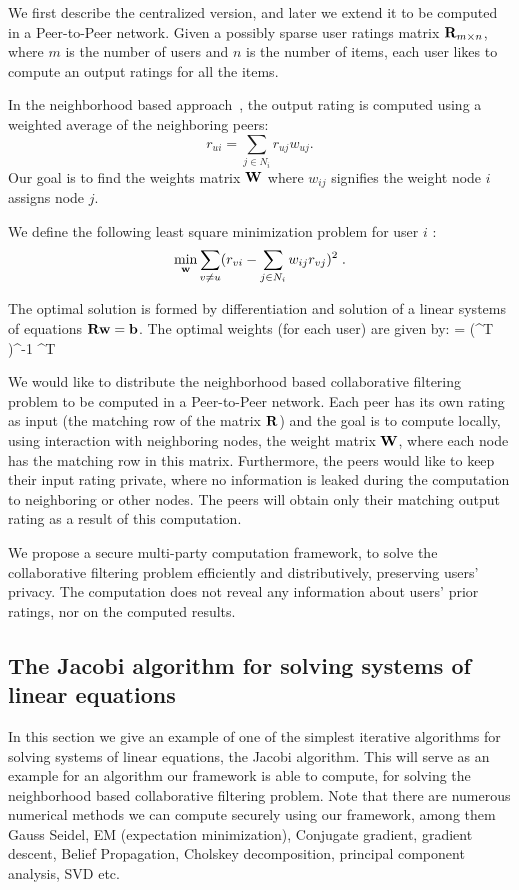 \documentclass[times, 10pt,twocolumn]{article}
\begin{document}
We first describe the centralized version, and later we extend it
to be computed in a Peer-to-Peer network. Given a possibly sparse
user ratings matrix ${\bf R}_{m \times n}$, where $m$ is the number of
users and $n$ is the number of items, each user likes to compute
an output ratings for all the items.

In the neighborhood based approach~\cite{KorenCF}, the output
rating is computed using a weighted average of the neighboring
peers:
\[ r_{ui} = \sum_{j \in N_i} r_{uj} w_{uj}. \]
Our goal is to find the weights matrix ${\bf W}$ where $w_{ij}$
signifies the weight node $i$ assigns node $j$.

We define the following least square minimization problem for user
$i$ :
\[ \min_{\bf w} \sum_{v \ne u}(r_{vi} - \sum_{j \in N_i}
w_{ij}r_{vj})^2\;. \]

The optimal solution is formed by differentiation and solution of
a linear systems of equations ${\bf R} {\bf w} = {\bf b}$. The optimal weights
(for each user) are given by: \BE \label{eqw} \vw = (\mR^T
\mR)^{-1} \mR^T \vb \EE

We would like to distribute the neighborhood based collaborative
filtering problem to be computed in a Peer-to-Peer network. Each
peer has its own rating as input (the matching row of the matrix
${\bf R}$) and the goal is to compute locally, using interaction with
neighboring nodes, the weight matrix ${\bf W}$, where each node has
the matching row in this matrix. Furthermore, the peers would like
to keep their input rating private, where no information is leaked
during the computation to neighboring or other nodes. The peers
will obtain only their matching output rating as a result of this
computation.

We propose a secure multi-party computation framework, to solve the
collaborative filtering problem efficiently and distributively,
preserving users' privacy. The computation does not reveal any
information about users' prior ratings, nor on the computed
results.

\subsection{The Jacobi algorithm for solving systems of
linear equations}\label{Jacobi} In this section we give an example
of one of the simplest iterative algorithms for solving systems of
linear equations, the Jacobi algorithm. This will serve as an
example for an algorithm our framework is able to compute, for
solving the neighborhood based collaborative filtering problem.
Note that there are numerous numerical methods we can compute
securely using our framework, among them Gauss Seidel, EM
(expectation minimization), Conjugate gradient, gradient descent,
Belief Propagation, Cholskey decomposition, principal component
analysis, SVD etc.
\end{document}

